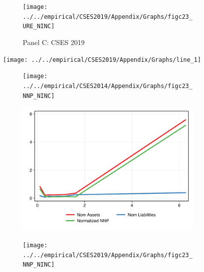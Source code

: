 \documentclass[11pt,letterpaper]{article}
\begin{document}
\begin{figure}
\begin{subfigure}{.33\textwidth}
			\end{subfigure}
			\begin{subfigure}{.33\textwidth}
				\centering
				\caption*{Panel C: CSES 2019}
				\label{fig:sub-first}
				
				\texttt{[image: ../../empirical/CSES2019/Appendix/Graphs/figc23\_URE\_NINC]} 
				\vspace{-2.5em}
				\newline {}
				
			\end{subfigure}
			
			\texttt{[image: ../../empirical/CSES2019/Appendix/Graphs/line\_1]} \vspace{-3em}
			\newline
			
			\begin{subfigure}{.33\textwidth}
				\centering
				\texttt{[image: ../../empirical/CSES2014/Appendix/Graphs/figc23\_NNP\_NINC]} 
				\vspace{-2.5em}
				\newline {}
			\end{subfigure}
			\begin{subfigure}{.33\textwidth}
				\centering
				\includegraphics[width=1\linewidth]{../../empirical/CSES2017/Appendix/Graphs/figc23_NNP_NINC} 
				\vspace{-2.5em}
				\newline {}
			\end{subfigure}
			\begin{subfigure}{.33\textwidth}
				\centering
				\texttt{[image: ../../empirical/CSES2019/Appendix/Graphs/figc23\_NNP\_NINC]} 
				\vspace{-2.5em}
				\newline {}
			\end{subfigure}
			

\end{figure}
\end{document}
